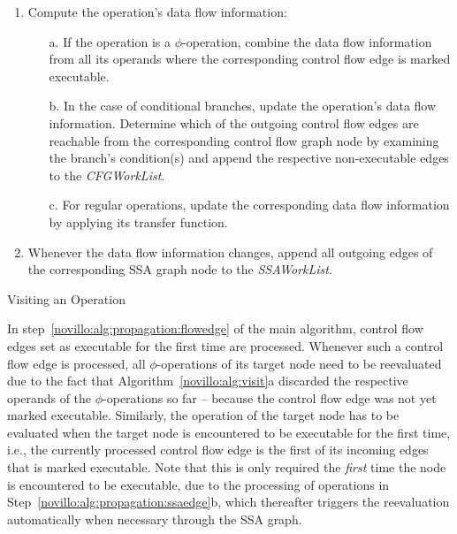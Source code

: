 \begin{algorithm}[t!]
  \begin{enumerate}
    \item Compute the operation's data flow information:
    \begin{enumerate}
      \vspace{-1.2ex}
      \item[a.] \label{novillo:alg:visit:phi} If the operation is a
                $\phi$-operation, combine the data flow information from all its
                operands where the corresponding control flow edge is marked 
                executable.
      \item[b.] \label{novillo:alg:visit:branch} In the case of conditional
                branches, update the operation's data flow information. Determine
                which of the outgoing control flow edges are reachable from the
                corresponding control flow graph node by examining the branch's
                condition(s) and append the respective non-executable edges to
                the \emph{CFGWorkList}.
      \item[c.] \label{novillo:alg:visit:regular} For regular operations, update
                the corresponding data flow information by applying its transfer
                function.
    \end{enumerate}
    \vspace{-1ex}
    \item Whenever the data flow information changes, append all outgoing edges
          of the corresponding SSA graph node to the \emph{SSAWorkList}.
  \end{enumerate}
  \caption{Visiting an Operation}
  \label{novillo:alg:visit}
\end{algorithm}

In step~\ref{novillo:alg:propagation:flowedge} of the main algorithm, control
flow edges set as executable for the first time are processed.
Whenever such a control flow edge is processed, all
$\phi$-operations of its target node need to be reevaluated due to the fact that
Algorithm~\ref{novillo:alg:visit}a discarded the respective operands of the
$\phi$-operations so far -- because the control flow edge was not yet marked
executable.
Similarly, the operation of the target node has to be evaluated when the target
node is encountered to be executable for the first time, i.e., the currently
processed control flow edge is the first of its incoming edges that is marked
executable. Note that this is only required the \emph{first} time the node is
encountered to be executable, due to the processing of operations in
Step~\ref{novillo:alg:propagation:ssaedge}b, which thereafter triggers the
reevaluation automatically when necessary through the SSA graph.

